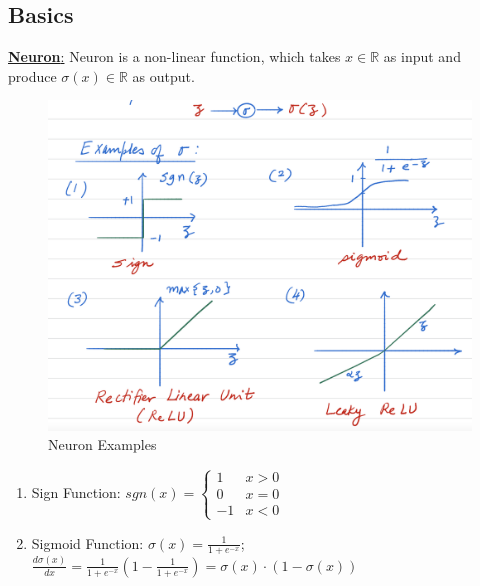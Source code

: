 \documentclass[11pt,a4paper]{article}
\begin{document}
\subsection{Basics}
\underline{\textbf{Neuron}:} Neuron is a non-linear function, which takes $x\in \mathbb{R}$ as input and produce $\sigma(x)\in \mathbb{R}$ as output.
\begin{center}\begin{figure}[htbp]
    \centering
    \includegraphics[scale=0.5]{NN.png}
    \caption{Neuron Examples}
    \label{Neuron}
\end{figure}\end{center}
\begin{enumerate}[(1)]
    \item Sign Function: $sgn(x)=\left\{\begin{matrix}
        1&x>0\\
        0&x=0\\
        -1&x<0
    \end{matrix}\right.$
    \item Sigmoid Function: $\sigma(x)=\frac{1}{1+e^{-x}}$; $\frac{d\sigma(x)}{dx}=\frac{1}{1+e^{-x}}\left(1-\frac{1}{1+e^{-x}}\right)=\sigma(x)\cdot(1-\sigma(x))$
\end{enumerate}
\end{document}
